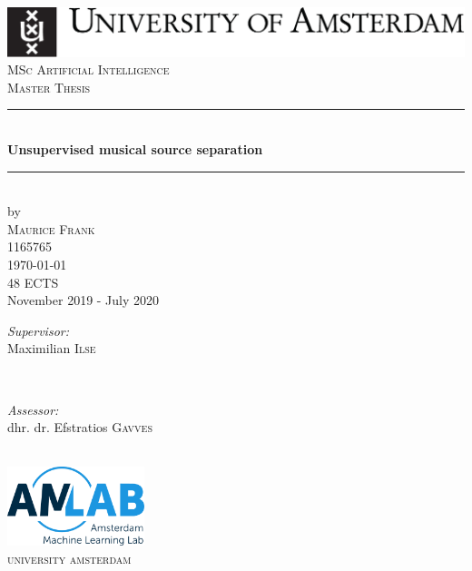 \begin{titlepage}
\begin{fullwidth}
\newcommand{\HRule}{\rule{\linewidth}{0.5mm}} %

\center %
\includegraphics[width=0.8\linewidth]{../data/images/uva_logo}\\[2.5cm]

\textsc{\Large MSc Artificial Intelligence}\\[0.2cm]
\textsc{\Large Master Thesis}\\[0.5cm]

\HRule \\[0.4cm]
{ \huge \bfseries Unsupervised musical source separation}\\[0.4cm] %
\HRule \\[0.5cm]


by\\[0.2cm]
\textsc{\Large Maurice Frank}\\[0.2cm]
1165765\\[1cm]

{\Large \today}\\[1cm]
48 ECTS\\ %

November 2019 - July 2020\\[1cm]%

\begin{minipage}[t]{0.5\textwidth}
\begin{flushleft} \large
\emph{Supervisor:} \\
Maximilian \textsc{Ilse}
\end{flushleft}
\end{minipage}
~
\begin{minipage}[t]{0.5\textwidth}
\begin{flushright} \large
\emph{Assessor:} \\
dhr. dr. Efstratios \textsc{Gavves}\\
\end{flushright}
\end{minipage}\\[2cm]


\includegraphics[width=4cm]{../data/images/amlab.eps}\\[1cm]
\textsc{\large university amsterdam}\\[1.0cm] %
\vfill %
\end{fullwidth}
\end{titlepage}
